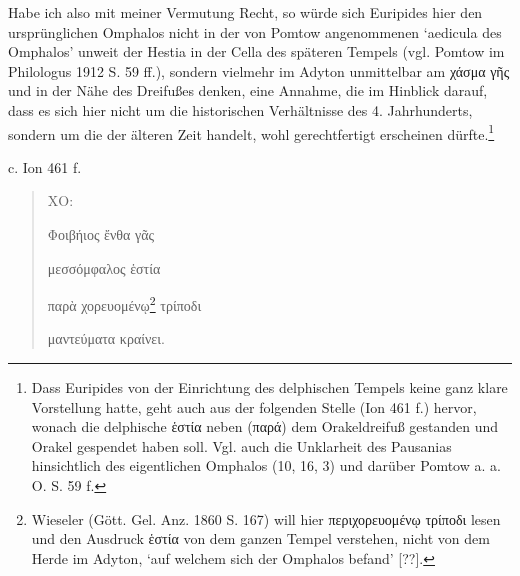 \documentclass[a4paper, 11pt, oneside]{article}
\begin{document}
Habe ich also mit meiner Vermutung Recht, so würde sich Euripides hier den ursprünglichen Omphalos nicht in der von Pomtow angenommenen `aedicula des Omphalos' unweit der Hestia in der Cella des späteren Tempels (vgl. Pomtow im Philologus 1912 S. 59 ff.), sondern vielmehr im Adyton unmittelbar am χάσμα γῆς und in der Nähe des Dreifußes denken, eine Annahme, die im Hinblick darauf, dass es sich hier nicht um die historischen Verhältnisse des 4. Jahrhunderts, sondern um die der älteren Zeit handelt, wohl gerechtfertigt erscheinen dürfte.\footnote{Dass Euripides von der Einrichtung des delphischen Tempels keine ganz klare Vorstellung hatte, geht auch aus der folgenden Stelle (Ion 461 f.) hervor, wonach die delphische ἑστία neben (παρά) dem Orakeldreifuß gestanden und Orakel gespendet haben soll. Vgl. auch die Unklarheit des Pausanias hinsichtlich des eigentlichen Omphalos (10, 16, 3) und darüber Pomtow a. a. O. S. 59 f.}

c. Ion 461 f.
\begin{quotation}
ΧΟ:

Φοιβήιος ἔνθα γᾶς

μεσσόμφαλος ἑστία

παρὰ χορευομένῳ\footnote{Wieseler (Gött. Gel. Anz. 1860 S. 167) will hier περιχορευομένῳ τρίποδι lesen und den Ausdruck ἑστία von dem ganzen Tempel verstehen, nicht von dem Herde im Adyton, `auf welchem sich der Omphalos befand' [??].} τρίποδι

μαντεύματα κραίνει.
\end{quotation}
\end{document}
